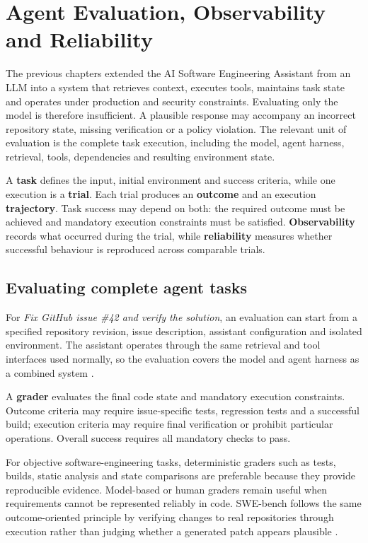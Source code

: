 
\chapter{Agent Evaluation, Observability and Reliability}

\label{chap:evaluation}

The previous chapters extended the AI Software Engineering Assistant from an LLM into a system that retrieves context, executes tools, maintains task state and operates under production and security constraints. Evaluating only the model is therefore insufficient. A plausible response may accompany an incorrect repository state, missing verification or a policy violation. The relevant unit of evaluation is the complete task execution, including the model, agent harness, retrieval, tools, dependencies and resulting environment state.

A \textbf{task} defines the input, initial environment and success criteria, while one execution is a \textbf{trial}. Each trial produces an \textbf{outcome} and an execution \textbf{trajectory}. Task success may depend on both: the required outcome must be achieved and mandatory execution constraints must be satisfied. \textbf{Observability} records what occurred during the trial, while \textbf{reliability} measures whether successful behaviour is reproduced across comparable trials.

\section{Evaluating complete agent tasks}

For \emph{Fix GitHub issue \#42 and verify the solution}, an evaluation can start from a specified repository revision, issue description, assistant configuration and isolated environment. The assistant operates through the same retrieval and tool interfaces used normally, so the evaluation covers the model and agent harness as a combined system \parencite{grace2026evals}.

A \textbf{grader} evaluates the final code state and mandatory execution constraints. Outcome criteria may require issue-specific tests, regression tests and a successful build; execution criteria may require final verification or prohibit particular operations. Overall success requires all mandatory checks to pass.

For objective software-engineering tasks, deterministic graders such as tests, builds, static analysis and state comparisons are preferable because they provide reproducible evidence. Model-based or human graders remain useful when requirements cannot be represented reliably in code. SWE-bench follows the same outcome-oriented principle by verifying changes to real repositories through execution rather than judging whether a generated patch appears plausible \parencite{jimenez2024swebench}.

